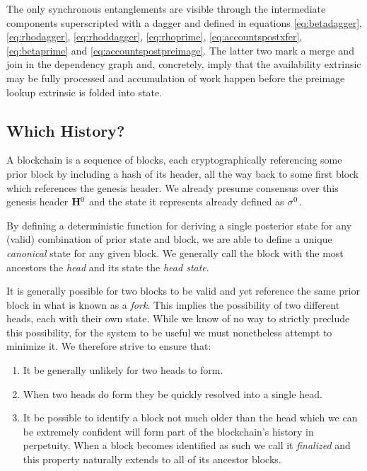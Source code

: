 The only synchronous entanglements are visible through the intermediate components superscripted with a dagger and defined in equations \ref{eq:betadagger}, \ref{eq:rhodagger}, \ref{eq:rhoddagger}, \ref{eq:rhoprime}, \ref{eq:accountspostxfer}, \ref{eq:betaprime} and \ref{eq:accountspostpreimage}. The latter two mark a merge and join in the dependency graph and, concretely, imply that the availability extrinsic may be fully processed and accumulation of work happen before the preimage lookup extrinsic is folded into state.

\subsection{Which History?}

A blockchain is a sequence of blocks, each cryptographically referencing some prior block by including a hash of its header, all the way back to some first block which references the genesis header. We already presume consensus over this genesis header $\mathbf{H}^0$ and the state it represents already defined as $\sigma^0$.

By defining a deterministic function for deriving a single posterior state for any (valid) combination of prior state and block, we are able to define a unique \emph{canonical} state for any given block. We generally call the block with the most ancestors the \emph{head} and its state the \emph{head state}.

It is generally possible for two blocks to be valid and yet reference the same prior block in what is known as a \emph{fork}. This implies the possibility of two different heads, each with their own state. While we know of no way to strictly preclude this possibility, for the system to be useful we must nonetheless attempt to minimize it. We therefore strive to ensure that:

\begin{enumerate}
  \item\label{enum:wh:minimize} It be generally unlikely for two heads to form.
  \item\label{enum:wh:resolve} When two heads do form they be quickly resolved into a single head.
  \item\label{enum:wh:finalize} It be possible to identify a block not much older than the head which we can be extremely confident will form part of the blockchain's history in perpetuity. When a block becomes identified as such we call it \emph{finalized} and this property naturally extends to all of its ancestor blocks.
\end{enumerate}

